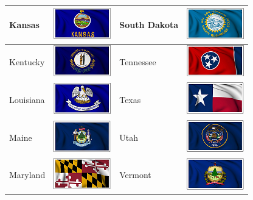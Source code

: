 \documentclass{ximera}
\begin{document}
\begin{center}
\begin{tabular}{|l|l|l|l|}
Kansas & \includegraphics{pics/StateFlags/Kansas.png} & South Dakota & \includegraphics{pics/StateFlags/SouthDakota.png} \\\hline 
Kentucky & \includegraphics{pics/StateFlags/Kentucky.png} & Tennessee & \includegraphics{pics/StateFlags/Tennessee.png} \\\hline 
Louisiana & \includegraphics{pics/StateFlags/Louisiana.png} & Texas & \includegraphics{pics/StateFlags/Texas.png} \\\hline 
Maine & \includegraphics{pics/StateFlags/Maine.png} & Utah & \includegraphics{pics/StateFlags/Utah.png} \\\hline 
Maryland & \includegraphics{pics/StateFlags/Maryland.png} & Vermont & \includegraphics{pics/StateFlags/Vermont.png} \\\hline 

\end{tabular}
\end{center}
\end{document}
